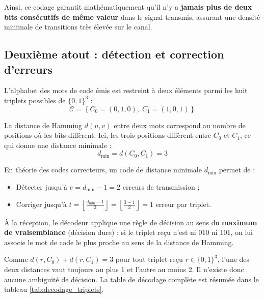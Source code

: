 \documentclass[a4paper,12pt]{report}
\begin{document}
Ainsi, ce codage garantit mathématiquement qu'il n'y a \textbf{jamais plus de deux bits consécutifs de même valeur} dans le signal transmis, assurant une densité minimale de transitions très élevée sur le canal.

\subsection{Deuxième atout : détection et correction d'erreurs}

L'alphabet des mots de code émis est restreint à deux éléments parmi les huit triplets possibles de $\{0, 1\}^3$ :
\[
    \mathcal{C} = \left\{ C_0 = (0, 1, 0),\; C_1 = (1, 0, 1) \right\}
\]

La distance de Hamming $d(u, v)$ entre deux mots correspond au nombre de positions où les bits diffèrent. Ici, les trois positions diffèrent entre $C_0$ et $C_1$, ce qui donne une distance minimale :
\[
    d_{\min} = d(C_0, C_1) = 3
\]

En théorie des codes correcteurs, un code de distance minimale $d_{\min}$ permet de :
\begin{itemize}
    \item Détecter jusqu'à $e = d_{\min} - 1 = 2$ erreurs de transmission ;
    \item Corriger jusqu'à $t = \left\lfloor \frac{d_{\min} - 1}{2} \right\rfloor = \left\lfloor \frac{3 - 1}{2} \right\rfloor = 1$ erreur par triplet.
\end{itemize}

À la réception, le décodeur applique une règle de décision au sens du \textbf{maximum de vraisemblance} (décision dure) : si le triplet reçu n'est ni $010$ ni $101$, on lui associe le mot de code le plus proche au sens de la distance de Hamming. 

Comme $d(r, C_0) + d(r, C_1) = 3$ pour tout triplet reçu $r \in \{0, 1\}^3$, l'une des deux distances vaut toujours au plus 1 et l'autre au moins 2. Il n'existe donc aucune ambiguïté de décision. La table de décodage complète est résumée dans le tableau \ref{tab:decodage_triplets}.
\end{document}
